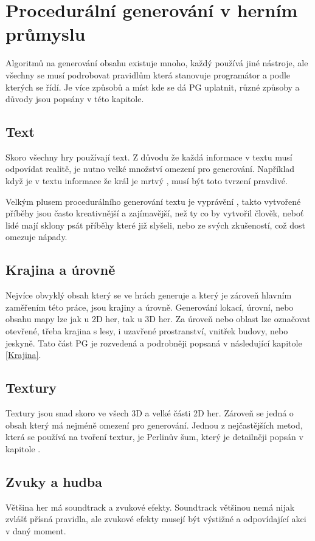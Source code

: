 
\section{Procedurální generování v herním průmyslu}
\label{metody}
Algoritmů na generování obsahu existuje mnoho, každý používá jiné nástroje, ale všechny se musí podrobovat pravidlům která stanovuje programátor a podle kterých se řídí. Je více způsobů a míst kde se dá PG uplatnit, různé způsoby a důvody jsou popsány v této kapitole.

\subsection{Text}
Skoro všechny hry používají text. Z důvodu že každá informace v textu musí odpovídat realitě, je nutno velké množství omezení pro generování. Například když je v textu informace že král je mrtvý \cite{liuDeep}, musí být toto tvrzení pravdivé.

Velkým plusem procedurálního generování textu je vyprávění \cite{madoc59000}, takto vytvořené příběhy jsou často kreativnější a zajímavější, než ty co by vytvořil člověk, neboť lidé mají sklony psát příběhy které již slyšeli, nebo ze svých zkušeností, což dost omezuje nápady.

\subsection{Krajina a úrovně}
Nejvíce obvyklý obsah který se ve hrách generuje a který je zároveň hlavním zaměřením této práce, jsou krajiny a úrovně. Generování lokací, úrovní, nebo obsahu mapy lze jak u 2D her, tak u 3D her. Za úroveň nebo oblast lze označovat otevřené, třeba krajina s lesy, i uzavřené prostranství, vnitřek budovy, nebo jeskyně. Tato část PG je rozvedená a podrobněji popsaná v následující kapitole \ref{Krajina}.

\subsection{Textury}
Textury jsou snad skoro ve všech 3D a velké části 2D her. Zároveň se jedná o obsah který má nejméně omezení pro generování. Jednou z nejčastějších metod, která se používá na tvoření textur, je  Perlinův šum, který je detailněji popsán v kapitole .

\subsection{Zvuky a hudba}
Většina her má soundtrack a zvukové efekty. Soundtrack většinou nemá nijak zvlášť přísná pravidla, ale zvukové efekty musejí být výstižné a odpovídající akci v daný moment. 

